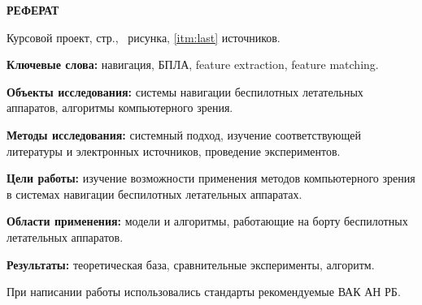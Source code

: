 \begin{center}
  \Large\bfseries{РЕФЕРАТ}
\end{center}

Курсовой проект, \pageref{LastPage} стр., \totalfigures\ рисунка, \ref{itm:last} источников.

\begin{center}
  \Large{\@jobtitle}
\end{center}

\textbf{Ключевые слова:} навигация, БПЛА, feature extraction, feature matching.

\textbf{Объекты исследования:} системы навигации беспилотных летательных аппаратов, алгоритмы компьютерного зрения.

\textbf{Методы исследования:} системный подход, изучение соответствующей литературы и электронных источников, проведение экспериментов.

\textbf{Цели работы:} изучение возможности применения методов компьютерного зрения в системах навигации беспилотных летательных аппаратах.

\textbf{Области применения:} модели и алгоритмы, работающие на борту беспилотных летательных аппаратов.

\textbf{Результаты:} теоретическая база, сравнительные эксперименты, алгоритм. 

При написании работы использовались стандарты рекомендуемые ВАК АН РБ.

\newpage